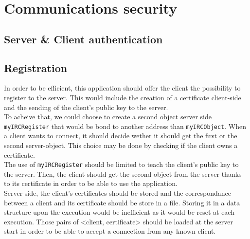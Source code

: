 \documentclass{article}
\begin{document}
\newpage


\section{Communications security}
\subsection{Server \& Client authentication}

\subsection{Registration}
In order to be efficient, this application should offer the client the possibility to register to the server. This would include the creation of a certificate client-side and the sending of the client's public key to the server.\\
To acheive that, we could choose to create a second object server side \texttt{myIRCRegister} that would be bond to another address than \texttt{myIRCObject}. When a client wants to connect, it should decide wether it should get the first or the second server-object. This choice may be done by checking if the client owns a certificate.\\
The use of \texttt{myIRCRegister} should be limited to teach the client's public key to the server. Then, the client should get the second object from the server thanks to its certificate in order to be able to use the application.\\
Server-side, the client's certificates should be stored and the correspondance between a client and its certificate should be store in a file. Storing it in a data structure upon the execution would be inefficient as it would be reset at each execution. Those pairs of <client, certificate> should be loaded at the server start in order to be able to accept a connection from any known client.
\end{document}
